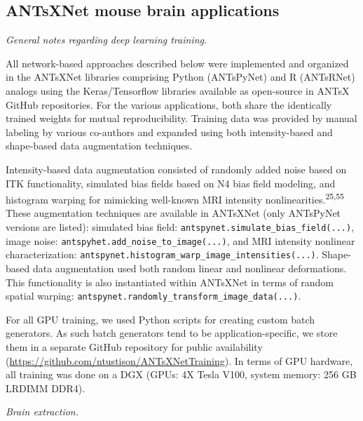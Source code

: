 \documentclass[
  12pt,
]{article}
\begin{document}
\hypertarget{antsxnet-mouse-brain-applications}{%
\subsection*{ANTsXNet mouse brain
applications}\label{antsxnet-mouse-brain-applications}}

\emph{General notes regarding deep learning training.}

All network-based approaches described below were implemented and
organized in the ANTsXNet libraries comprising Python (ANTsPyNet) and R
(ANTsRNet) analogs using the Keras/Tensorflow libraries available as
open-source in ANTsX GitHub repositories. For the various applications,
both share the identically trained weights for mutual reproducibility.
Training data was provided by manual labeling by various co-authors and
expanded using both intensity-based and shape-based data augmentation
techniques.

Intensity-based data augmentation consisted of randomly added noise
based on ITK functionality, simulated bias fields based on N4 bias field
modeling, and histogram warping for mimicking well-known MRI intensity
nonlinearities.\textsuperscript{25,55} These augmentation techniques are
available in ANTsXNet (only ANTsPyNet versions are listed): simulated
bias field: \texttt{antspynet.simulate\_bias\_field(...)}, image noise:
\texttt{antspyhet.add\_noise\_to\_image(...)}, and MRI intensity
nonlinear characterization:
\texttt{antspynet.histogram\_warp\_image\_intensities(...)}. Shape-based
data augmentation used both random linear and nonlinear deformations.
This functionality is also instantiated within ANTsXNet in terms of
random spatial warping:
\texttt{antspynet.randomly\_transform\_image\_data(...)}.

For all GPU training, we used Python scripts for creating custom batch
generators. As such batch generators tend to be application-specific, we
store them in a separate GitHub repository for public availability
(\url{https://github.com/ntustison/ANTsXNetTraining}). In terms of GPU
hardware, all training was done on a DGX (GPUs: 4X Tesla V100, system
memory: 256 GB LRDIMM DDR4).

\emph{Brain extraction.}
\end{document}
